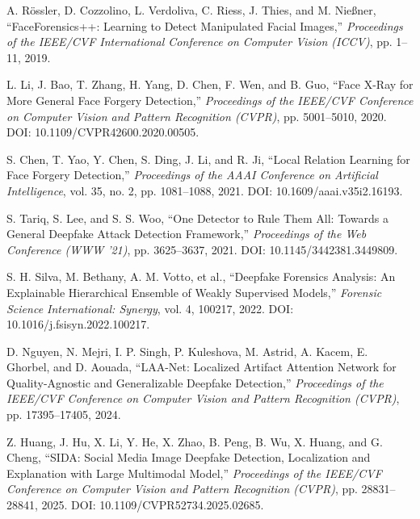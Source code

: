 \documentclass[12pt,a4paper,oneside]{report}
\begin{document}
\begin{enumerate}[label={[\arabic*]},leftmargin=1cm]

\item
A. Rössler, D. Cozzolino, L. Verdoliva, C. Riess, J. Thies, and M. Nießner,
``FaceForensics++: Learning to Detect Manipulated Facial Images,''
\textit{Proceedings of the IEEE/CVF International Conference on Computer Vision (ICCV)},
pp. 1--11, 2019.

\item
L. Li, J. Bao, T. Zhang, H. Yang, D. Chen, F. Wen, and B. Guo,
``Face X-Ray for More General Face Forgery Detection,''
\textit{Proceedings of the IEEE/CVF Conference on Computer Vision and Pattern Recognition (CVPR)},
pp. 5001--5010, 2020.
DOI: 10.1109/CVPR42600.2020.00505.

\item
S. Chen, T. Yao, Y. Chen, S. Ding, J. Li, and R. Ji,
``Local Relation Learning for Face Forgery Detection,''
\textit{Proceedings of the AAAI Conference on Artificial Intelligence},
vol. 35, no. 2, pp. 1081--1088, 2021.
DOI: 10.1609/aaai.v35i2.16193.

\item
S. Tariq, S. Lee, and S. S. Woo,
``One Detector to Rule Them All: Towards a General Deepfake Attack Detection Framework,''
\textit{Proceedings of the Web Conference (WWW '21)},
pp. 3625--3637, 2021.
DOI: 10.1145/3442381.3449809.

\item
S. H. Silva, M. Bethany, A. M. Votto, et al.,
``Deepfake Forensics Analysis: An Explainable Hierarchical Ensemble of Weakly Supervised Models,''
\textit{Forensic Science International: Synergy},
vol. 4, 100217, 2022.
DOI: 10.1016/j.fsisyn.2022.100217.

\item
D. Nguyen, N. Mejri, I. P. Singh, P. Kuleshova, M. Astrid,
A. Kacem, E. Ghorbel, and D. Aouada,
``LAA-Net: Localized Artifact Attention Network for Quality-Agnostic
and Generalizable Deepfake Detection,''
\textit{Proceedings of the IEEE/CVF Conference on Computer Vision
and Pattern Recognition (CVPR)}, pp. 17395--17405, 2024.

\item
Z. Huang, J. Hu, X. Li, Y. He, X. Zhao, B. Peng, B. Wu,
X. Huang, and G. Cheng,
``SIDA: Social Media Image Deepfake Detection, Localization and
Explanation with Large Multimodal Model,''
\textit{Proceedings of the IEEE/CVF Conference on Computer Vision
and Pattern Recognition (CVPR)}, pp. 28831--28841, 2025.
DOI: 10.1109/CVPR52734.2025.02685.


\end{enumerate}


\end{document}
